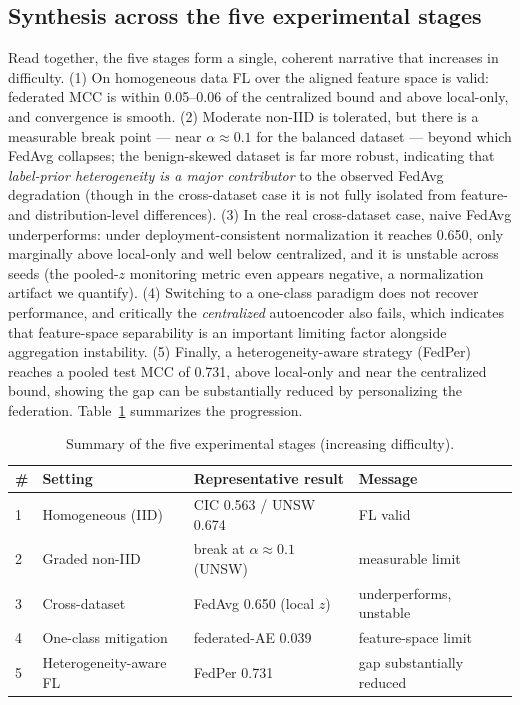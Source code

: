 \documentclass[11pt,a4paper]{article}
\begin{document}
\subsection{Synthesis across the five experimental stages}
Read together, the five stages form a single, coherent narrative that
increases in difficulty. (1) On homogeneous data FL over the aligned feature space is valid:
federated MCC is within 0.05--0.06 of the centralized bound and above local-only,
and convergence is smooth. (2) Moderate non-IID is tolerated, but there is a
measurable break point --- near \(\alpha\approx0.1\) for the balanced dataset ---
beyond which FedAvg collapses; the benign-skewed dataset is far more robust,
indicating that \emph{label-prior heterogeneity is a major contributor} to the
observed FedAvg degradation (though in the cross-dataset case it is not fully
isolated from feature- and distribution-level differences). (3) In the real
cross-dataset case, naive FedAvg underperforms: under deployment-consistent
normalization it reaches 0.650, only marginally above local-only and well below
centralized, and it is unstable across seeds (the pooled-$z$ monitoring metric
even appears negative, a normalization artifact we quantify). (4) Switching
to a one-class paradigm does not recover performance, and critically the
\emph{centralized} autoencoder also fails, which indicates that feature-space
separability is an important limiting factor alongside aggregation instability.
(5) Finally, a heterogeneity-aware strategy (FedPer) reaches a pooled test MCC of
0.731, above local-only and near the centralized bound, showing the gap can be
substantially reduced by personalizing the federation. Table~\ref{tab:summary}
summarizes the progression.

\begin{table}[htbp]
\centering\small
\caption{Summary of the five experimental stages (increasing difficulty).}
\label{tab:summary}
\begin{tabular}{@{}llll@{}}
\toprule
\# & Setting & Representative result & Message \\
\midrule
1 & Homogeneous (IID)      & CIC 0.563 / UNSW 0.674 & FL valid \\
2 & Graded non-IID         & break at $\alpha\approx0.1$ (UNSW) & measurable limit \\
3 & Cross-dataset          & FedAvg 0.650 (local $z$) & underperforms, unstable \\
4 & One-class mitigation   & federated-AE 0.039 & feature-space limit \\
5 & Heterogeneity-aware FL & FedPer 0.731 & gap substantially reduced \\
\bottomrule
\end{tabular}
\end{table}
\end{document}
